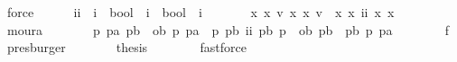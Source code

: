 \begin{isabellebody}
\ force\isanewline
\ \ \ \ \isamarkupfalse%
\ ii\ {\isacharcolon}{\isacharcolon}\ {\isachardoublequoteopen}{\isacharparenleft}i\ {\isasymRightarrow}\ bool{\isacharparenright}\ {\isasymRightarrow}\ {\isacharparenleft}i\ {\isasymRightarrow}\ bool{\isacharparenright}\ {\isasymRightarrow}\ i{\isachardoublequoteclose}\ \isanewline
\ \ \ \ \ \ {\isachardoublequoteopen}{\isasymforall}x{}\ x{}{\isachardot}\ {\isacharparenleft}{\isasymexists}v{}{\isachardot}\ {\isacharparenleft}x{}\isactrlbold {\isasymand}{\isacharparenleft}\isactrlbold {\isasymnot}\ x{}{\isacharparenright}{\isacharparenright}\ v{}{\isacharparenright}\ {\isacharequal}\ {\isacharparenleft}x{}\isactrlbold {\isasymand}{\isacharparenleft}\isactrlbold {\isasymnot}\ x{}{\isacharparenright}{\isacharparenright}\ {\isacharparenleft}ii\ x{}\ x{}{\isacharparenright}{\isachardoublequoteclose}\isanewline
\ \ \ \ \ \ \isamarkupfalse%
\ moura\isanewline
\ \ \ \ \isamarkupfalse%
\ \isamarkupfalse%
\ {\isachardoublequoteopen}{\isasymforall}p\ pa\ pb{\isachardot}\ {\isacharparenleft}{\isacharparenleft}{\isasymnot}\ ob\ p\ pa{\isacharparenright}\ {\isasymor}\ {\isacharparenleft}p\isactrlbold {\isasymand}{\isacharparenleft}\isactrlbold {\isasymnot}\ pb{\isacharparenright}{\isacharparenright}\ {\isacharparenleft}ii\ pb\ p{\isacharparenright}{\isacharparenright}\ {\isasymor}\ ob\ pb\ {\isacharparenleft}\isactrlbold {\isasymor}\ {\isacharparenleft}pb\isactrlbold {\isasymand}{\isacharparenleft}\isactrlbold {\isasymnot}\ p{\isacharparenright}{\isacharparenright}\ pa{\isacharparenright}{\isachardoublequoteclose}\isanewline
\ \ \ \ \ \ \isamarkupfalse%
\ f{}\ \isamarkupfalse%
\ presburger\isanewline
\ \ \ \ \isamarkupfalse%
\ \isamarkupfalse%
\ {\isacharquery}thesis\isanewline
\ \ \ \ \ \ \isamarkupfalse%
\ fastforce\isanewline
\ \ \isamarkupfalse%
\isanewline
{}\isamarkupfalse%
\isanewline
%
%
\endisatagproof
{\isafoldproof}%
%
\isadelimproof
%
\endisadelimproof
%
\isadelimdocument
%
\endisadelimdocument
%
\isatagdocument
%
\isamarkuptrue%
%
%
\endisatagdocument
{\isafolddocument}%
%
\isadelimdocument
\isanewline
%
\endisadelimdocument
{}\isamarkupfalse%

\end{isabellebody}
